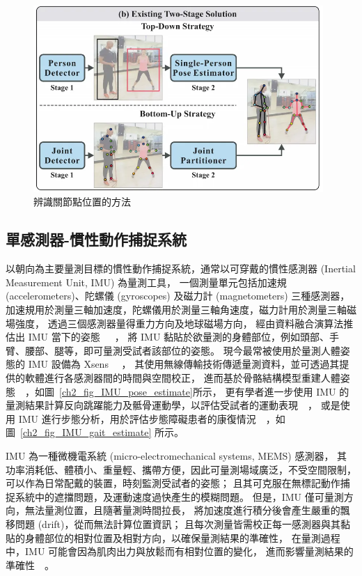 \begin{figure}[!ht]
    \centering
    \includegraphics[width=11cm]{figure/ch2_fig_topvsbottom.png}
     \caption[辨識關節點位置的方法 ~\cite{nie2019single}]{辨識關節點位置的方法 ~\cite{nie2019single}}
     \label{ch2_fig_topvsbottom}
\end{figure}

\clearpage

\subsection{單感測器-慣性動作捕捉系統}
以朝向為主要量測目標的慣性動作捕捉系統，通常以可穿戴的慣性感測器 (Inertial Measurement Unit, IMU) 為量測工具，
一個測量單元包括加速規 (accelerometers)、陀螺儀 (gyroscopes) 及磁力計 (magnetometers) 三種感測器，
加速規用於測量三軸加速度，陀螺儀用於測量三軸角速度，磁力計用於測量三軸磁場強度，
透過三個感測器量得重力方向及地球磁場方向，
經由資料融合演算法推估出 IMU 當下的姿態~\cite{young2009comparison}~\cite{madgwick2011estimation}~\cite{nazarahari202140}，
將 IMU 黏貼於欲量測的身體部位，例如頭部、手臂、腰部、腿等，即可量測受試者該部位的姿態。
現今最常被使用於量測人體姿態的 IMU 設備為 Xsens ~\cite{roetenberg2009xsens}~\cite{paulich2018xsens}，
其使用無線傳輸技術傳遞量測資料，並可透過其提供的軟體進行各感測器間的時間與空間校正，
進而基於骨骼結構模型重建人體姿態~\cite{mcgrath2020body}~\cite{DIP:SIGGRAPHAsia:2018}，如圖~\ref{ch2_fig_IMU_pose_estimate}所示，
更有學者進一步使用 IMU 的量測結果計算反向跳躍能力及骶骨運動學，以評估受試者的運動表現~\cite{mcginnis2016quantifying}~\cite{miranda2022accuracy}，
或是使用 IMU 進行步態分析，用於評估步態障礙患者的康復情況~\cite{wang2020imu}~\cite{uchitomi2022three}，如圖~\ref{ch2_fig_IMU_gait_estimate} 所示。

IMU 為一種微機電系統 (micro-electromechanical systems, MEMS) 感測器，
其功率消耗低、體積小、重量輕、攜帶方便，因此可量測場域廣泛，不受空間限制，可以作為日常配戴的裝置，時刻監測受試者的姿態；
且其可克服在無標記動作捕捉系統中的遮擋問題，及運動速度過快產生的模糊問題。
但是，IMU 僅可量測方向，無法量測位置，且隨著量測時間拉長，
將加速度進行積分後會產生嚴重的飄移問題 (drift)，從而無法計算位置資訊；
且每次測量皆需校正每一感測器與其黏貼的身體部位的相對位置及相對方向，以確保量測結果的準確性，
在量測過程中，IMU 可能會因為肌肉出力與放鬆而有相對位置的變化，
進而影響量測結果的準確性~\cite{fiorentino2017soft}~\cite{stagni2005quantification}。

